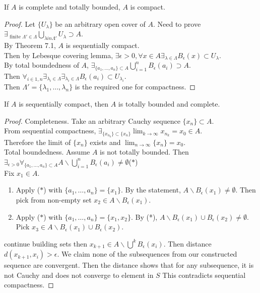 \documentclass[11pt]{article}
\begin{document}
\begin{theorem}[8.1]
    If $A$ is complete and totally bounded, $A$ is compact.
\end{theorem}
\begin{proof}
    Let $\{U_{\lambda}\}$ be an arbitrary open cover of $A$.
    Need to prove $\exists_{\text{ finite } \Lambda' \in \Lambda} \bigcup_{\lambda in \Lambda'}U_\lambda \supset A$.\\
    By Theorem 7.1, $A$ is sequentially compact.\\ 
    Then by Lebesque covering lemma, $\exists \epsilon > 0, \forall x \in A \exists_{\lambda \in \Lambda} B_\epsilon(x) \subset U_\lambda$.\\
    By total boundedness of $A$, $\exists_{\{a_1, \dots, a_n\} \subset A} \bigcup^n_{i=1}B_\epsilon(a_i) \supset A$.\\
    Then $\forall_{i \in 1,n}\exists_{\lambda_i\in \Lambda}\exists_{\lambda_i \in \Lambda}B_\epsilon(a_i) \subset U_{\lambda_i}$.\\
    Then $\Lambda' = \{\lambda_1, \dots, \lambda_n\}$ is the required one for compactness.
\end{proof}
\begin{theorem}[9.2]
    If $A$ is sequentially compact, then $A$ is totally bounded and complete.
\end{theorem}
\begin{proof}
    Completeness. Take an arbitrary Cauchy sequence $\{x_n\} \subset A$. \\
    From sequential compactness, $\exists_{\{x_{n_k}\} \subset \{x_n\}} \lim_{k \to \infty}x_{n_k} = x_0 \in A$.\\
    Therefore the limit of $\{x_n\}$ exists and $\lim_{n \to \infty} \{x_n\} = x_0$.\\
    Total boundedness. Assume $A$ is not totally bounded. Then $\exists_{\epsilon > 0} \forall_{\{a_1,\dots,a_n\} \subset A}A \backslash \bigcup^n_{i=1}B_\epsilon (a_i) \ne \emptyset$($*$)\\
    Fix $x_1 \in A$.
    \begin{enumerate}
        \item[Step 1:] Apply ($*$) with $\{a_1,\dots,a_n\} = \{x_1\}$. By the statement, $A \backslash B_\epsilon(x_1) \ne \emptyset$.
        Then pick from non-empty set $x_2 \in A \backslash B_\epsilon(x_1)$.
        \item[Step 2:] Apply ($*$) with $\{a_1, \dots, a_n\} = \{x_1, x_2\}$. By (*), $A \backslash B_\epsilon(x_1) \cup B_\epsilon(x_2) \ne \emptyset$. Pick $x_3 \in A \backslash B_\epsilon(x_1) \cup B_\epsilon(x_2)$.
    \end{enumerate}
    continue building sets then $x_{k+1} \in A \backslash \bigcup^{k} B_\epsilon (x_i)$. Then distance $d(x_{k+1}, x_i) > \epsilon$. We claim none of the subsequences from our constructed sequence are convergent. Then the distance shows that 
    for any subsequence, it is not Cauchy and does not converge to element in $S$ This contradicts sequential compactness.
\end{proof}
\end{document}
